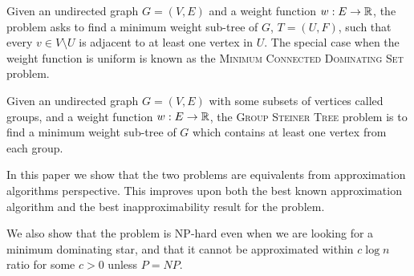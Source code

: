 Given an undirected graph $G = (V, E)$ and a weight function $w:E \to \mathbb{R}$, 
the \Problem{} problem asks to find a minimum weight sub-tree of $G$, 
$T = (U, F)$, such that every $v \in V \setminus U$ is adjacent to at least one 
vertex in $U$.
The special case when the weight function is uniform is known as the 
\textsc{Minimum Connected Dominating Set} problem.

Given an undirected graph $G = (V, E)$ with some subsets of vertices called groups,
and a weight function $w:E \to \mathbb{R}$,
the \textsc{Group Steiner Tree} problem is to find a minimum weight sub-tree
of $G$ which contains at least one vertex from each group. 

In this paper we show that the two problems are equivalents 
from approximation algorithms perspective.
This improves upon both the best known approximation algorithm and the best 
inapproximability result for the \Problem{} problem.
  
We also show that the \Problem{} problem is NP-hard even when we are looking for
a minimum dominating star, and that it cannot be approximated within $c\log n$ ratio
for some $c > 0$ unless $P = NP$.
